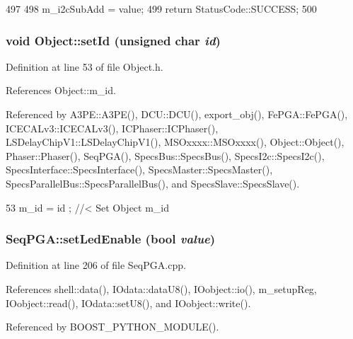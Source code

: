 \begin{DoxyCode}
497                                                         {
498   m_i2cSubAdd = value;
499   return StatusCode::SUCCESS;
500 }
\end{DoxyCode}
\hypertarget{classObject_a398fe08cba594a0ce6891d59fe4f159f}{
\subsubsection[{setId}]{\setlength{\rightskip}{0pt plus 5cm}void Object::setId (unsigned char {\em id})}}
\label{classObject_a398fe08cba594a0ce6891d59fe4f159f}


Definition at line 53 of file Object.h.

References Object::m\_\-id.

Referenced by A3PE::A3PE(), DCU::DCU(), export\_\-obj(), FePGA::FePGA(), ICECALv3::ICECALv3(), ICPhaser::ICPhaser(), LSDelayChipV1::LSDelayChipV1(), MSOxxxx::MSOxxxx(), Object::Object(), Phaser::Phaser(), SeqPGA(), SpecsBus::SpecsBus(), SpecsI2c::SpecsI2c(), SpecsInterface::SpecsInterface(), SpecsMaster::SpecsMaster(), SpecsParallelBus::SpecsParallelBus(), and SpecsSlave::SpecsSlave().


\begin{DoxyCode}
53 { m_id    = id    ; } //< Set Object m_id
\end{DoxyCode}
\hypertarget{classSeqPGA_a2e256a39e1bc4fbfa23de3760a7bd19a}{
\subsubsection[{setLedEnable}]{ SeqPGA::setLedEnable (bool {\em value})}}
\label{classSeqPGA_a2e256a39e1bc4fbfa23de3760a7bd19a}


Definition at line 206 of file SeqPGA.cpp.

References shell::data(), IOdata::dataU8(), IOobject::io(), m\_\-setupReg, IOobject::read(), IOdata::setU8(), and IOobject::write().

Referenced by BOOST\_\-PYTHON\_\-MODULE().


